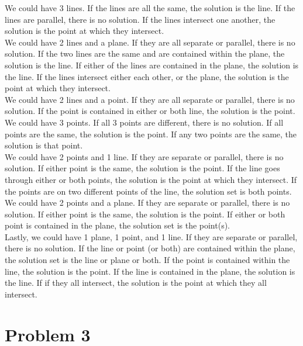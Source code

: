 \documentclass{article}
\begin{document}
We could have 3 lines. If the lines are all the same, the solution is the line. If the lines are parallel, there is no solution. If the lines intersect one another, the solution is the point at which they intersect. 
\\

We could have 2 lines and a plane. If they are all separate or parallel, there is no solution. If the two lines are the same and are contained within the plane, the solution is the line. If either of the lines are contained in the plane, the solution is the line. If the lines intersect either each other, or the plane, the solution is the point at which they intersect.
\\

We could have 2 lines and a point. If they are all separate or parallel, there is no solution. If the point is contained in either or both line, the solution is the point.
\\

We could have 3 points. If all 3 points are different, there is no solution. If all points are the same, the solution is the point. If any two points are the same, the solution is that point.
\\

We could have 2 points and 1 line. If they are separate or parallel, there is no solution. If either point is the same, the solution is the point. If the line goes through either or both points, the solution is the point at which they intersect. If the points are on two different points of the line, the solution set is both points.
\\

We could have 2 points and a plane. If they are separate or parallel, there is no solution. If either point is the same, the solution is the point. If either or both point is contained in the plane, the solution set is the point(s).
\\

Lastly, we could have 1 plane, 1 point, and 1 line. If they are separate or parallel, there is no solution. If the line or point (or both) are contained within the plane, the solution set is the line or plane or both. If the point is contained within the line, the solution is the point. If the line is contained in the plane, the solution is the line. If if they all intersect, the solution is the point at which they all intersect.

\section*{Problem 3}
\end{document}
